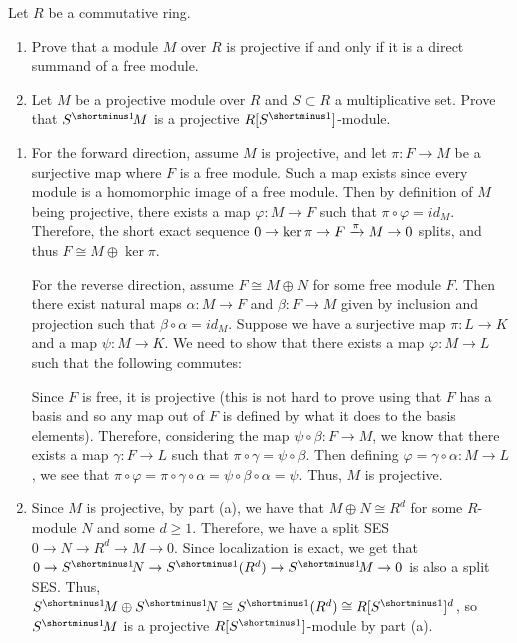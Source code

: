 \begin{question}[subtitle = January 2022 Problem 3,ID=Jan22_3]
Let $R$ be a commutative ring.
\begin{enumerate}
    \item Prove that a module $M$ over $R$ is projective if and only if it is a direct summand of a free module.
    \item Let $M$ be a projective module over $R$ and $S \subset R$ a multiplicative set. Prove that $S\linv M$ is a projective $R[S\inv]$-module.
\end{enumerate}
\end{question}
\begin{solution}
\begin{enumerate}
    \item For the forward direction, assume $M$ is projective, and let $\pi\colon F \to M$ be a surjective map where $F$ is a free module. Such a map exists since every module is a homomorphic image of a free module. Then by definition of $M$ being projective, there exists a map $\varphi\colon M \to F$ such that $\pi \circ \varphi = id_M$. Therefore, the short exact sequence $0 \to \ker \pi \to F \xrightarrow{\pi} M \to 0$ splits, and thus $F \cong M \oplus \ker \pi$.
    
    For the reverse direction, assume $F \cong M \oplus N$ for some free module $F$. Then there exist natural maps $\alpha\colon M \to F$ and $\beta\colon F \to M$ given by inclusion and projection such that $\beta \circ \alpha = id_M$. Suppose we have a surjective map $\pi\colon L \to K$ and a map $\psi\colon M \to K$. We need to show that there exists a map $\varphi\colon M \to L$ such that the following commutes:
    Since $F$ is free, it is projective (this is not hard to prove using that $F$ has a basis and so any map out of $F$ is defined by what it does to the basis elements). Therefore, considering the map $\psi \circ \beta\colon F \to M$, we know that there exists a map $\gamma\colon F \to L$ such that $\pi \circ \gamma = \psi \circ \beta$. Then defining $\varphi = \gamma\circ\alpha\colon M \to L$, we see that $\pi \circ \varphi = \pi \circ \gamma \circ \alpha = \psi \circ \beta \circ \alpha = \psi$. Thus, $M$ is projective.
    \item Since $M$ is projective, by part (a), we have that $M \oplus N \cong R^d$ for some $R$-module $N$ and some $d \geq 1$. Therefore, we have a split SES $0 \to N \to R^d \to M \to 0$. Since localization is exact, we get that $0 \to S\linv N \to S\inv(R^d) \to S\linv M \to 0$ is also a split SES. Thus, $S\linv M \oplus S\linv N \cong S\inv(R^d) \cong R[S\inv]^d$, so $S\linv M$ is a projective $R[S\inv]$-module by part (a).
\end{enumerate}
\end{solution}

